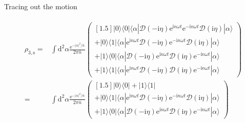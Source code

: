 \documentclass[10pt,fleqn]{article}
\newcommand{\ud}{\mathrm{d}}
\newcommand{\ue}{\mathrm{e}}
\newcommand{\ui}{\mathrm{i}}
\newcommand{\eqar}[1]
{
  \begin{align}
    #1
  \end{align}
}
\newcommand{\abs}[1]{{\left|{#1}\right|}}
\begin{document}
Tracing out the motion
\eqar{
  \begin{split}
    \rho_{3,\mathrm{s}}=
    &\int\ud^2\alpha \frac{\ue^{-\abs{\alpha}^2/{\bar n}}}{2\pi {\bar n}}
      \begin{pmatrix}[1.5]
        |0\rangle\langle0|
        \langle\alpha|\mathcal{D}(-\ui\eta)\ue^{\ui n\omega t}
        \ue^{-\ui n\omega t}\mathcal{D}(\ui\eta)|\alpha\rangle\\
        +|0\rangle\langle1|
        \langle\alpha|\ue^{\ui n\omega t}\mathcal{D}(-\ui\eta)
        \ue^{-\ui n\omega t}\mathcal{D}(\ui\eta)|\alpha\rangle
        \\
        +|1\rangle\langle0|
        \langle\alpha|\mathcal{D}(-\ui\eta)\ue^{\ui n\omega t}
        \mathcal{D}(\ui\eta)\ue^{-\ui n\omega t}|\alpha\rangle
        \\
        +|1\rangle\langle1|
        \langle\alpha|\ue^{\ui n\omega t}\mathcal{D}(-\ui\eta)
        \mathcal{D}(\ui\eta)\ue^{-\ui n\omega t}|\alpha\rangle
      \end{pmatrix}\\
    =&\int\ud^2\alpha \frac{\ue^{-\abs{\alpha}^2/{\bar n}}}{2\pi {\bar n}}
       \begin{pmatrix}[1.5]
         |0\rangle\langle0|
         +|1\rangle\langle1|\\
         +|0\rangle\langle1|
         \langle\alpha|\ue^{\ui n\omega t}\mathcal{D}(-\ui\eta)
         \ue^{-\ui n\omega t}\mathcal{D}(\ui\eta)|\alpha\rangle
         \\
         +|1\rangle\langle0|
         \langle\alpha|\mathcal{D}(-\ui\eta)\ue^{\ui n\omega t}
         \mathcal{D}(\ui\eta)\ue^{-\ui n\omega t}|\alpha\rangle
       \end{pmatrix}
  \end{split}
}
\end{document}
